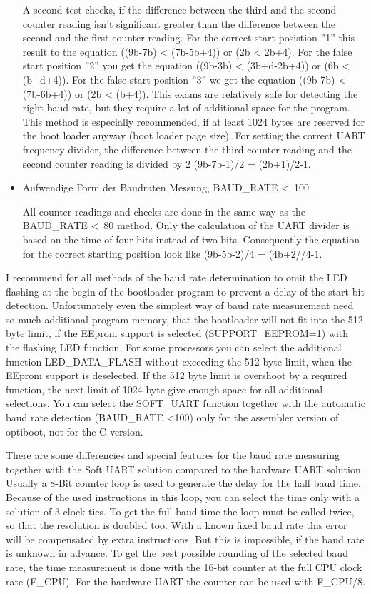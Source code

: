 \begin{itemize}
A second test checks, if the difference between the third and the
second counter reading isn't significant greater than the difference
between the second and the first counter reading.
For the correct start posistion ''1'' this result to the equation ((9b-7b) < (7b-5b+4))
or (2b < 2b+4).
For the false start position ''2'' you get the equation ((9b-3b) < (3b+d-2b+4)) or
(6b < (b+d+4)).
For the false start position ''3'' we get the equation ((9b-7b) < (7b-6b+4)) or (2b < (b+4)).
This exams are relatively safe for detecting the right baud rate, but they
require a lot of additional space for the program.
This method is especially recommended, if at least 1024 bytes are reserved
for the boot loader anyway (boot loader page size).
For setting the correct UART frequency divider, the difference between 
the third counter reading and the second counter reading is divided by 2
(9b-7b-1)/2 = (2b+1)/2-1.

\item {Aufwendige Form der Baudraten Messung, BAUD\_RATE \textless~100}

All counter readings and checks are done in the same way as the
BAUD\_RATE \textless~80 method. Only the calculation of
the UART divider is based on the time of four bits instead of two bits.
Consequently the equation for the correct starting position
look like (9b-5b-2)/4 = (4b+2//4-1.

\end{itemize}

I recommend for all methods of the baud rate determination to omit
the LED flashing at the begin of the bootloader program
to prevent a delay of the start bit detection.
Unfortunately even the simplest way of baud rate measurement
need so much additional program memory, that the bootloader
will not fit into the 512 byte limit, if the EEprom support
is selected (SUPPORT\_EEPROM=1) with the flashing LED function.
For some processors you can select the additional function LED\_DATA\_FLASH
without exceeding the 512 byte limit, when the EEprom support is deselected.
If the 512 byte limit is overshoot by a required function,
the next limit of 1024 byte give enough space for all additional
selections.
You can select the SOFT\_UART function together with the automatic
baud rate detection (BAUD\_RATE \textless 100) only for the
assembler version of optiboot, not for the C-version.

There are some differencies and special features for the baud rate measuring
together with the Soft UART solution compared to the hardware UART solution.
Usually a 8-Bit counter loop is used to generate the delay for the half baud time.
Because of the used instructions in this loop, you can select the time
only with a solution of 3 clock tics.
To get the full baud time the loop must be called twice, so that
the resolution is doubled too.
With a known fixed baud rate this error will be compensated by extra instructions.
But this is impossible, if the baud rate  is unknown in advance.
To get the best possible rounding of the selected baud rate,
the time measurement is done with the 16-bit counter at the full CPU clock rate (F\_CPU).
For the hardware UART the counter can be used with F\_CPU/8.


